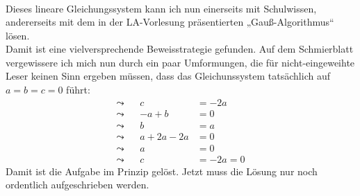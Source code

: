 \begin{de}
\[\begin{array}{ccccccc}
  \end{array} \]
  Dieses lineare Gleichungssystem kann ich nun einerseits mit Schulwissen, andererseits mit dem in der LA-Vorlesung präsentierten „Gauß-Algorithmus“ lösen. \\[0.5em]
  Damit ist eine vielversprechende Beweisstrategie gefunden. Auf dem Schmierblatt vergewissere ich mich nun durch ein paar Umformungen, die für nicht-eingeweihte Leser keinen Sinn ergeben müssen, dass das Gleichunssystem tatsächlich auf $a=b=c=0$ führt:
  \begin{align*}
\leadsto&&   c & = -2a \\
   \leadsto&& -a + b & = 0 \\
   \leadsto&& b& = a \\
   \leadsto&& a +2a-2a & = 0 \\
   \leadsto&& a &= 0 \\
   \leadsto && c & = -2a=0
  \end{align*}
Damit ist die Aufgabe im Prinzip gelöst. Jetzt muss die Lösung nur noch ordentlich aufgeschrieben werden.
  \end{de}
 
